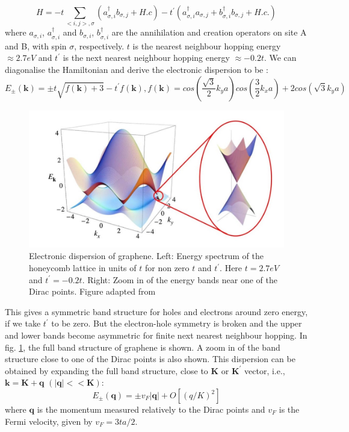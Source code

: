 \begin{equation}
	H= -t\sum_{<i,j>,\sigma}(a_{\sigma,i}^\dagger b_{\sigma,j}+H.c)-t^\prime(a_{\sigma,i}^\dagger a_{\sigma,j}+b_{\sigma,i}^\dagger b_{\sigma,j}+H.c.)
\end{equation}
where $a_{\sigma,i}$, $a_{\sigma,i}^\dagger$ and $b_{\sigma,i}$, $b_{\sigma,i}^\dagger$ are the annihilation and creation operators on site A and B, with spin $\sigma$, respectively. $t$ is the nearest neighbour hopping energy $\approx 2.7eV$ and $t^\prime$ is the next nearest neighbour hopping energy $\approx -0.2 t$. We can diagonalise the Hamiltonian and derive the electronic dispersion to be \cite{Geim}:
\begin{equation}
	E_\pm(\mathbf{k})=\pm t \sqrt{f(\mathbf{k})+3}-t^\prime f(\mathbf{k}), f(\mathbf{k})= cos(\frac{\sqrt{3}}{2}k_y a)cos(\frac{3}{2}k_x a )+2cos(\sqrt{3}k_y a)
\end{equation}

\begin{figure}[H]
	\centering
	\includegraphics[width=\textwidth]{figures/dispersion.jpg}
	\caption{Electronic dispersion of graphene. Left: Energy spectrum of the honeycomb lattice in units of $t$ for non zero $t$ and $t^\prime$. Here $t=2.7 eV$ and $t^\prime=-0.2t$. Right: Zoom in of the energy bands near one of the Dirac points. Figure adapted from \cite{Geim}}
	\label{fig:dispersion}
\end{figure}
This gives a symmetric band structure for holes and electrons around zero energy, if we take $t^\prime$ to be zero. But the electron-hole symmetry is broken and the upper and lower bands become asymmetric for finite next nearest neighbour hopping. In
fig. \ref{fig:dispersion}, the full band structure of graphene is shown. A zoom in of the band structure close to one of the Dirac points is also shown. This dispersion can be
obtained by expanding the full band structure, close to $\mathbf{K}$ or $\mathbf{K^\prime}$ vector, i.e., $\mathbf{k}=\mathbf{K}+\mathbf{q}$ $(|\mathbf{q}|<<\mathbf{K})$:
\begin{equation}
	E_\pm(\mathbf{q})=\pm v_F|\mathbf{q}|+ O[(q/K)^2]
\end{equation}
where $\mathbf{q}$ is the momentum measured relatively to the
Dirac points and $v_F$ is the Fermi velocity, given by $v_F=3ta/ 2$.

